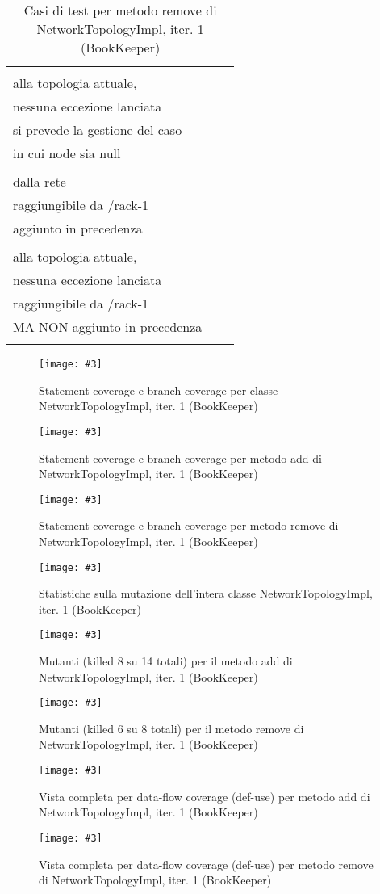 \documentclass[10pt, a4paper]{article}
\newcommand{\Intmaketable}[4]{
	\begin{longtable}{#3}
	#4
	\caption{#2}
	\label{#1}
	\end{longtable}
}
\newcommand{\Inttestctable}[3]{
	\Intmaketable{#1}{#2}{|l|l|l|}{
	\hline
	\thead{Input} & \thead{Esito atteso} & \thead{Motivazione}\\
	\hline
	\hline
	#3
	\hline}
}
\newcommand{\Inttestccaption}[4]{Casi di test per metodo #1 di #2, iter. #3 (#4)}
\newcommand{\gettablelabel}[5]{table:#1:#2:#3:iter#4:proj#5}
\newcommand{\testctable}[5]{
	\Inttestctable{\gettablelabel{testc}{#1}{#2}{#3}{#4}}
		{\Inttestccaption{#1}{#2}{#3}{#4}}
		{#5}
}
\newcommand{\getpicturelabel}[1]{picture:#1}
\newcommand{\makepicture}[4]{
	\begin{figure}[H]
	\centering
	\texttt{[image: \#3]}
	\caption{#4}
	\label{\getpicturelabel{#3}}
	\end{figure}
}
\newcommand{\alldfcovcaption}[4]{Vista completa per data-flow coverage (def-use) per metodo #1 di #2, iter. #3 (#4)}
\newcommand{\methodcfcovcaption}[4]{Statement coverage e branch coverage per metodo #1 di #2, iter. #3 (#4)}
\newcommand{\classcfcovcaption}[3]{Statement coverage e branch coverage per classe #1, iter. #2 (#3)}
\newcommand{\mutclasscaption}[3]{Statistiche sulla mutazione dell'intera classe #1, iter. #2 (#3)}
\newcommand{\mutmethodcaption}[6]{Mutanti (killed #5 su #6 totali) per il metodo #1 di #2, iter. #3 (#4)}
\newcommand{\tcell}{\makecell[tl]}
\newcommand{\newtrow}{\\ \hline}
\def\bookkeeper{BookKeeper}
\begin{document}
	\testctable{remove}{NetworkTopologyImpl}{1}{\bookkeeper}{
			\tcell{null} & \tcell{Nessuna variazione rispetto\\ alla topologia attuale,\\ nessuna 
			eccezione lanciata} & \tcell{Specifica della documentazione:\\ si prevede la gestione del 
			caso\\ in cui node sia null}
		\newtrow
			\tcell{buildNode("/rack-1","bookie-1")} & \tcell{Rimozione con successo del nodo\\ dalla rete} & \tcell{Il nodo è una foglia (un server bk)\\ raggiungibile da /rack-1\\ aggiunto in precedenza}
		\newtrow
			\tcell{buildNode("/rack-1","bookie-2")} & \tcell{Nessuna variazione rispetto\\ alla topologia attuale,\\ nessuna eccezione lanciata} & \tcell{Il nodo è una foglia (un server bk)\\ raggiungibile da /rack-1\\ MA NON aggiunto in precedenza}
		\newtrow
	}	
	
	\makepicture{17cm}{1.15cm}{bk/controlflow-NetworkTopologyImpl-1}
				{\classcfcovcaption{NetworkTopologyImpl}{1}{\bookkeeper}}
				
	\makepicture{17cm}{0.75cm}{bk/controlflow-add-NetworkTopologyImpl-1}
				{\methodcfcovcaption{add}{NetworkTopologyImpl}{1}{\bookkeeper}}
				
	\makepicture{17cm}{0.75cm}{bk/controlflow-remove-NetworkTopologyImpl-1}
				{\methodcfcovcaption{remove}{NetworkTopologyImpl}{1}{\bookkeeper}}
				
	\makepicture{17cm}{1.5cm}{bk/mutation-NetworkTopologyImpl-1}
				{\mutclasscaption{NetworkTopologyImpl}{1}{\bookkeeper}}
				
	\makepicture{17cm}{15cm}{bk/mutation-add-NetworkTopologyImpl-1}
				{\mutmethodcaption{add}{NetworkTopologyImpl}{1}{\bookkeeper}{8}{14}}
	
	\makepicture{17cm}{10cm}{bk/mutation-remove-NetworkTopologyImpl-1}
				{\mutmethodcaption{remove}{NetworkTopologyImpl}{1}{\bookkeeper}{6}{8}}
				
	\makepicture{13cm}{23cm}{bk/dataflow-add-NetworkTopologyImpl-1}
				{\alldfcovcaption{add}{NetworkTopologyImpl}{1}{\bookkeeper}}
				
	\makepicture{13cm}{15cm}{bk/dataflow-remove-NetworkTopologyImpl-1}
				{\alldfcovcaption{remove}{NetworkTopologyImpl}{1}{\bookkeeper}}
\end{document}
